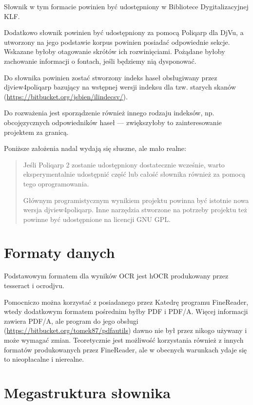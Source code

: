 \documentclass[12]{mwart}
\newcommand{\program}[1]{\textsf{#1}}
\begin{document}
Słownik w tym
formacie powinien być udostępniony w Bibliotece Dygitalizacyjnej KLF.

Dodatkowo słownik powinien być udostępniony za pomocą
\program{Poliqarp dla DjVu}, a utworzony na jego podstawie korpus
powinien posiadać odpowiednie sekcje. Wskazane byłoby otagowanie
skrótów ich rozwinięciami. Pożądane byłoby zachowanie informacji o
fontach, jeśli będziemy nią dysponować.

Do słownika powinien zostać stworzony indeks haseł obsługiwany przez
\program{djview4poliqarp} bazujący na wstępnej wersji indeksu dla
tzw. starych skanów (\url{https://bitbucket.org/jsbien/ilindecsv/}).

Do rozważenia jest sporządzenie również innego rodzaju indeksów,
np. obcojęzycznych odpowiedników haseł --- zwiększyłoby to
zainteresowanie projektem za granicą.

Poniższe założenia nadal wydają się słuszne, ale mało realne:

\begin{quote}
  Jeśli Poliqarp 2 zostanie udostępniony dostatecznie wcześnie, warto
  eksperymentalnie udostępnić część lub całość słownika również za
  pomocą tego oprogramowania.

  Głównym programistycznym wynikiem projektu powinna być istotnie nowa
  wersja \program{djview4poliqarp}. Inne narzędzia stworzone na
  potrzeby projektu też powinne być udostępnione na licencji GNU GPL.
\end{quote}

\section{Formaty danych}
\label{sec:formaty-danych-i}


Podstawowym formatem dla wyników OCR jest hOCR produkowany przez
\textsf{tesseract} i \textsf{ocrodjvu}.

Pomocniczo można korzystać z posiadanego przez Katedrę programu
\program{FineReader}, wtedy dodatkowym formatem pośrednim byłby PDF i
PDF/A. Więcej informacji zawiera PDF/A, ale program do jego obsługi
(\url{https://bitbucket.org/tomek87/pdfautils}) dawno nie był przez
nikogo używany i może wymagać zmian. Teoretycznie jest możliwość
korzystania również z innych formatów produkowanych przez
\textsf{FineReader}, ale w obecnych warunkach ydaje się to
nieopłacalne i nierealne.

\section{Megastruktura słownika}
\label{sec:megastr-sown-i}
\end{document}
